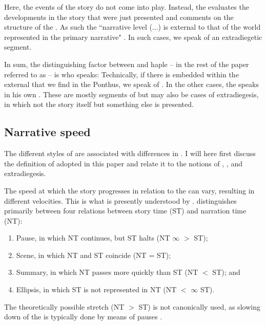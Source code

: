 \documentclass[output=paper,colorlinks,citecolor=brown]{langscibook}
\begin{document}
\noindent Here, the events of the story do not come into play. Instead, the  evaluates the developments in the story that were just presented and comments on the structure of the . As such the ``narrative level (...) is external to that of the world represented in the primary narrative" \citep[211]{Pier1986}. In such cases, we speak of an extradiegetic segment.

In sum, the distinguishing factor between  and  haple -- in the rest of the paper referred to as  -- is who speaks: Technically, if there is embedded   within the external  that we find in the Ponthus, we speak of . In the other cases, the  speaks in his own . These are mostly segments of  but may also be cases of extradiegesis, in which not the story itself but something else is presented.

\subsection{Narrative speed}\label{sec:2.2}
The different styles of  are associated with differences in  \citep[e.g][]{Genette1972, Genette1980, Packard2008}. I will here first discuss the definition of  adopted in this paper and relate it to the notions of , , and extradiegesis.
 
The speed at which the story progresses in relation to the   can vary, resulting in different velocities. This is what is presently understood by . \citet[95]{Genette1972} distinguishes primarily between four relations between story time (ST) and narration time (NT): 

\begin{enumerate}[label=(\roman*), noitemsep]
	\item Pause, in which NT continues, but ST halts (NT $\infty$ $>$ ST); 
	\item Scene, in which NT and ST coincide (NT = ST); 
	\item Summary, in which NT passes more quickly than ST (NT $<$ ST); and 
	\item Ellipsis, in which ST is not represented in NT (NT $<$ $\infty$ ST).
\end{enumerate}

\noindent The theoretically possible stretch (NT $>$ ST) is not canonically used, as slowing down of the  is typically done by means of pauses \citep[93--112]{Genette1972}.
\end{document}
